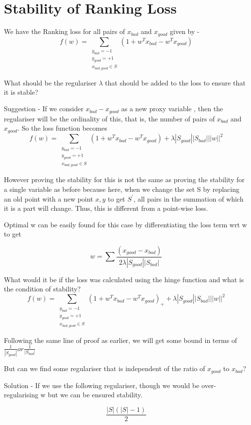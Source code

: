 
\section{Stability of Ranking Loss}
We have the Ranking loss for all pairs of $x_{bad}$ and $x_{good}$ given by -
$${f(w) = \sum_{\substack{y_{bad}=-1 \\ y_{good}=+1 \\ x_{bad,good}\in S}}( 1 + w^{T}x_{bad} -  w^{T}x_{good})}$$

What should be the regulariser $\lambda$ that should be added to the loss to ensure that it is stable?

Suggestion - If we consider $x_{bad} - x_{good}$ as a new proxy variable , then the regulariser will be the ordinality of this, that is, the number of pairs of $x_{bad}$ and $x_{good}$. So the loss function becomes 
$${f(w) = \sum_{\substack{y_{bad}=-1 \\ y_{good}=+1 \\ x_{bad,good}\in S}}( 1 + w^{T}x_{bad} -  w^{T}x_{good}) + \lambda |S_{good}||S_{bad}|||w||^2}$$

However proving the stability for this is not the same as proving the stability for a single variable as before because here, when we change the set S by replacing an old point with a new point ${x,y}$ to get $S^{'}$, all pairs in the summation of which it is a part will change. Thus, this is different from a point-wise loss. 

Optimal w can be easily found for this case by differentiating the loss term wrt w to get

$${w = \sum\frac{(x_{good} - x_{bad})}{2\lambda|S_{good}||S_{bad}|}}$$

What would it be if the loss was calculated using the hinge function and what is the condition of stability?
$${f(w) = \sum_{\substack{y_{bad}=-1 \\ y_{good}=+1 \\ x_{bad,good}\in S}}( 1 + w^{T}x_{bad} -  w^{T}x_{good})_{+} + \lambda |S_{good}||S_{bad}|||w||^2}$$

Following the same line of proof as earlier, we will get some bound in terms of ${\frac{1}{|S_{good}|} or \frac{1}{|S_{bad}|}}$

But can we find some regulariser that is independent of the ratio of $x_{good}$ to $x_{bad}$?

Solution - If we use the following regulariser, though we would be over-regularising w but we can be ensured stability.

$${\frac {|S|(|S|-1)}{2}}$$
